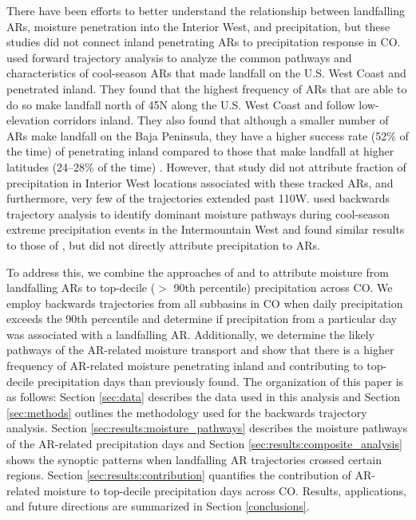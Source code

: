 \documentclass[draft]{agujournal2019}
\begin{document}
There have been efforts to better understand the relationship between landfalling ARs, moisture penetration into the Interior West, and precipitation, but these studies did not connect inland penetrating ARs to precipitation response in CO.  used forward trajectory analysis to analyze the common pathways and characteristics of cool-season ARs that made landfall on the U.S. West Coast and penetrated inland. They found that the highest frequency of ARs that are able to do so make landfall north of 45\textdegree N along the U.S. West Coast and follow low-elevation corridors inland. They also found that although a smaller number of ARs make landfall on the Baja Peninsula, they have a higher success rate (52\% of the time) of penetrating inland compared to those that make landfall at higher latitudes (24--28\% of the time) \cite{Rutz2015}. However, that study did not attribute fraction of precipitation in Interior West locations associated with these tracked ARs, and furthermore, very few of the trajectories extended past 110\textdegree W.  used backwards trajectory analysis to identify dominant moisture pathways during cool-season extreme precipitation events in the Intermountain West and found similar results to those of , but did not directly attribute precipitation to ARs. 

To address this, we combine the approaches of  and  to attribute moisture from landfalling ARs to top-decile ($>$ 90th percentile) precipitation across CO. We employ backwards trajectories from all subbasins in CO when daily precipitation exceeds the 90th percentile and determine if precipitation from a particular day was associated with a landfalling AR. Additionally, we determine the likely pathways of the AR-related moisture transport and show that there is a higher frequency of AR-related moisture penetrating inland and contributing to top-decile precipitation days than previously found. The organization of this paper is as follows: Section \ref{sec:data} describes the data used in this analysis and Section \ref{sec:methods} outlines the methodology used for the backwards trajectory analysis. Section \ref{sec:results:moisture_pathways} describes the moisture pathways of the AR-related precipitation days and Section \ref{sec:results:composite_analysis} shows the synoptic patterns when landfalling AR trajectories crossed certain regions. Section \ref{sec:results:contribution} quantifies the contribution of AR-related moisture to top-decile precipitation days across CO. Results, applications, and future directions are summarized in Section \ref{conclusions}. 
\end{document}
